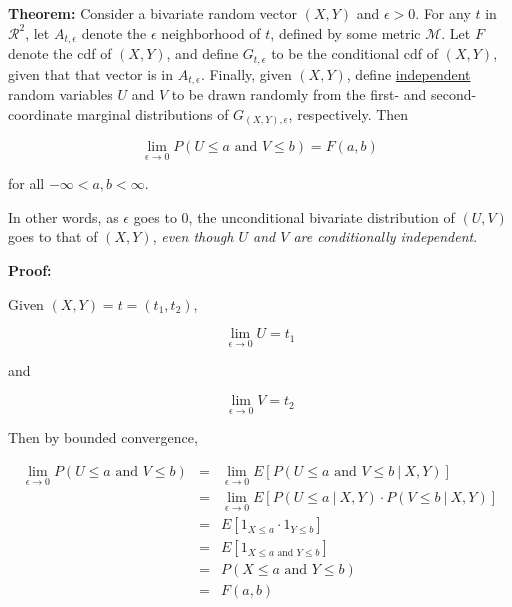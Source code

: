 \documentclass[11pt]{article}
\begin{document}
{\bf Theorem:}  Consider a bivariate random vector $(X,Y)$ and $\epsilon
> 0$.  For any $t$ in $\mathcal{R}^2$, let $A_{t,\epsilon}$ denote the
$\epsilon$ neighborhood of $t$, defined by some metric $\mathcal{M}$.
Let $F$ denote the cdf of $(X,Y)$, and define $G_{t,\epsilon}$ to be the
conditional cdf of $(X,Y)$, given that that vector is in
$A_{t,\epsilon}$.  Finally, given $(X,Y)$, define
\underline{independent} random variables $U$ and $V$ to be drawn
randomly from the first- and second-coordinate marginal distributions of
$G_{(X,Y),\epsilon}$, respectively.  Then

\begin{equation}
\lim_{\epsilon \rightarrow 0}
P
\left (
U \leq a \textrm{ and } V \leq b
\right )
= F(a,b)
\end{equation}

for all $-\infty < a,b < \infty$.  

In other words, as $\epsilon$ goes to 0, the unconditional bivariate
distribution of $(U,V)$ goes to that of $(X,Y)$, {\it even though $U$
and $V$ are conditionally independent}.

{\bf Proof:}

Given $(X,Y) = t = (t_1,t_2)$,

\begin{equation}
\lim_{\epsilon \rightarrow 0} U = t_1
\end{equation}

and

\begin{equation}
\lim_{\epsilon \rightarrow 0} V = t_2
\end{equation}


Then by bounded convergence,

\begin{eqnarray}
\lim_{\epsilon \rightarrow 0}
P
\left (
U \leq a \textrm{ and } V \leq b
\right )
&=& 
\lim_{\epsilon \rightarrow 0}
E \left [
P
\left (
U \leq a \textrm{ and } V \leq b
~|~ X,Y \right )
\right ] \\ 
&=& 
\lim_{\epsilon \rightarrow 0}
E \left [
P(U \leq a ~|~ X,Y ) \cdot
P(V \leq b ~|~ X,Y ) 
\right ] \\
&=& E \left [
1_{X \leq a} \cdot
1_{Y \leq b}
\right ] \\
&=& E \left [
1_{X \leq a \textrm{ and } Y \leq b}
\right ] \\
&=& P(X \leq a \textrm{ and } Y \leq b) \\
&=& F(a,b)
\end{eqnarray}
\end{document}
